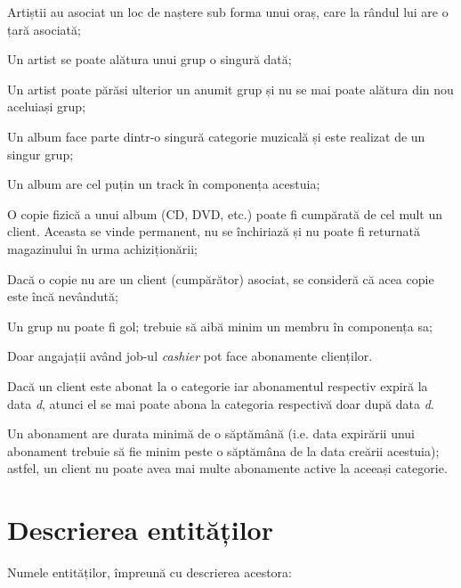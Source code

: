 \documentclass[a4paper, oneside, 12pt]{article}
\begin{document}
\begin{m_itemize}
        \item Artiștii au asociat un loc de naștere sub forma unui oraș, care
              la rândul lui are o țară asociată;
        \item Un artist se poate alătura unui grup o singură dată;
        \item Un artist poate părăsi ulterior un anumit grup și nu se mai poate
              alătura din nou aceluiași grup;
        \item Un album face parte dintr-o singură categorie muzicală și este
              realizat de un singur grup;
        \item Un album are cel puțin un track în componența acestuia;
        \item O copie fizică a unui album (CD, DVD, etc.) poate fi cumpărată de
              cel mult un client. Aceasta se vinde permanent, nu se
              închiriază și nu poate fi returnată magazinului în urma
              achiziționării;
        \item Dacă o copie nu are un client (cumpărător) asociat, se consideră
              că acea copie este încă nevândută;
        \item Un grup nu poate fi gol; trebuie să aibă minim un membru în
              componența sa;
        \item Doar angajații având job-ul \emph{cashier} pot face abonamente
              clienților.
        \item Dacă un client este abonat la o categorie iar abonamentul
              respectiv expiră la data \emph{d}, atunci el se mai poate abona
              la categoria respectivă doar după data \emph{d}.
        \item Un abonament are durata minimă de o săptămână (i.e. data
              expirării unui abonament trebuie să fie minim peste o săptămâna
              de la data creării acestuia); astfel, un client nu poate avea
              mai multe abonamente active la aceeași categorie.

\end{m_itemize}

\section{Descrierea entităților}

Numele entităților, împreună cu descrierea acestora:
\end{document}
